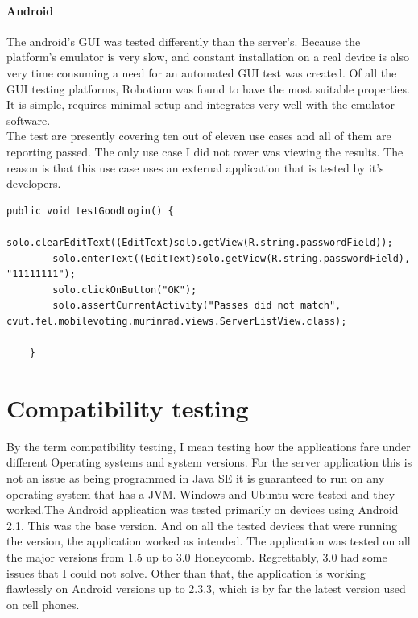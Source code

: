\documentclass[11pt,twoside,a4paper]{book}
\begin{document}
\paragraph{Android}
The android's GUI was tested differently than the server's. Because the platform's emulator is very slow, and constant installation on a real device is also very time consuming a need for an automated GUI test was created. Of all the GUI testing platforms, Robotium was found to have the most suitable properties. It is simple, requires minimal setup and integrates very well with the emulator software. \\
The test are presently covering ten out of eleven use cases and all of them are reporting passed. The only use case I did not cover was viewing the results. The reason is that this use case uses an external application that is tested by it's developers. 
\begin{lstlisting}
public void testGoodLogin() {
		solo.clearEditText((EditText)solo.getView(R.string.passwordField));
		solo.enterText((EditText)solo.getView(R.string.passwordField), "11111111");
		solo.clickOnButton("OK");
		solo.assertCurrentActivity("Passes did not match", cvut.fel.mobilevoting.murinrad.views.ServerListView.class);
		
	}
\end{lstlisting}
\section{Compatibility testing}
By the term compatibility testing, I mean testing how the applications fare under different Operating systems and system versions. For the server application this is not an issue as being programmed in Java SE it is guaranteed to run on any operating system that has a JVM. Windows and Ubuntu were tested and they worked.The Android application was tested primarily on devices using Android 2.1. This was the base version. And on all the tested devices that were running the version, the application worked as intended.  The application was tested on all the major versions from 1.5 up to 3.0 Honeycomb. Regrettably, 3.0 had some issues that I could not solve. Other than that, the application is working flawlessly on Android versions up to 2.3.3, which is by far the latest version used on cell phones.
\end{document}
